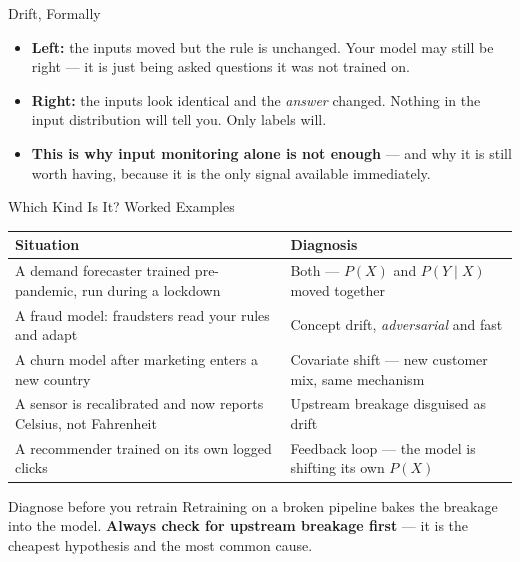 \begin{frame}{Drift, Formally}
    \vspace{0.18em}
    \begin{itemize}
        \scriptsize
        \item \textbf{Left:} the inputs moved but the rule is unchanged. Your model may still be right ---
              it is just being asked questions it was not trained on.
        \item \textbf{Right:} the inputs look identical and the \emph{answer} changed. Nothing in the input
              distribution will tell you. Only labels will.
        \item \textbf{This is why input monitoring alone is not enough} --- and why it is still worth having,
              because it is the only signal available immediately.
    \end{itemize}

\end{frame}

\begin{frame}{Which Kind Is It? Worked Examples}

    \centering
    \renewcommand{\arraystretch}{1.35}
    {\small
    \begin{tabular}{p{6.4cm}|p{5.0cm}}
        \toprule
        \textbf{Situation} & \textbf{Diagnosis} \\
        \midrule
        A demand forecaster trained pre-pandemic, run during a lockdown &
            Both --- $P(X)$ and $P(Y\mid X)$ moved together \\
        A fraud model: fraudsters read your rules and adapt &
            Concept drift, \emph{adversarial} and fast \\
        A churn model after marketing enters a new country &
            Covariate shift --- new customer mix, same mechanism \\
        A sensor is recalibrated and now reports Celsius, not Fahrenheit &
            Upstream breakage disguised as drift \\
        A recommender trained on its own logged clicks &
            Feedback loop --- the model is shifting its own $P(X)$ \\
        \bottomrule
    \end{tabular}}

    \vspace{0.9em}
    \begin{alertblock}{Diagnose before you retrain}
        Retraining on a broken pipeline bakes the breakage into the model. \textbf{Always check for upstream
        breakage first} --- it is the cheapest hypothesis and the most common cause.
    \end{alertblock}

\end{frame}


